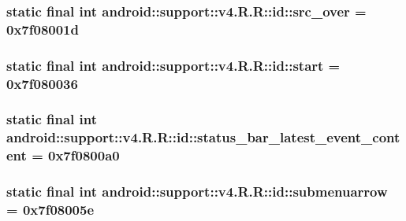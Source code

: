 \hypertarget{classandroid_1_1support_1_1v4_1_1_r_1_1id_97fd0140638b60720fb1d3e643df0a37}{
\subsubsection[{src\_\-over}]{\setlength{\rightskip}{0pt plus 5cm}static final int android::support::v4.R.R::id::src\_\-over = 0x7f08001d}}
\label{classandroid_1_1support_1_1v4_1_1_r_1_1id_97fd0140638b60720fb1d3e643df0a37}


\hypertarget{classandroid_1_1support_1_1v4_1_1_r_1_1id_1899870ae1d9308f0fe179896370747b}{
\subsubsection[{start}]{\setlength{\rightskip}{0pt plus 5cm}static final int android::support::v4.R.R::id::start = 0x7f080036}}
\label{classandroid_1_1support_1_1v4_1_1_r_1_1id_1899870ae1d9308f0fe179896370747b}


\hypertarget{classandroid_1_1support_1_1v4_1_1_r_1_1id_d5148188afcd19c1129a587170a7664b}{
\subsubsection[{status\_\-bar\_\-latest\_\-event\_\-content}]{\setlength{\rightskip}{0pt plus 5cm}static final int android::support::v4.R.R::id::status\_\-bar\_\-latest\_\-event\_\-content = 0x7f0800a0}}
\label{classandroid_1_1support_1_1v4_1_1_r_1_1id_d5148188afcd19c1129a587170a7664b}


\hypertarget{classandroid_1_1support_1_1v4_1_1_r_1_1id_e0e8bde8a5920021192a566797132f96}{
\subsubsection[{submenuarrow}]{\setlength{\rightskip}{0pt plus 5cm}static final int android::support::v4.R.R::id::submenuarrow = 0x7f08005e}}
\label{classandroid_1_1support_1_1v4_1_1_r_1_1id_e0e8bde8a5920021192a566797132f96}


